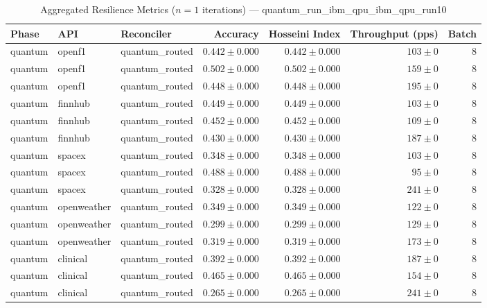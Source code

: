 
\begin{table}[htbp]
\caption{Aggregated Resilience Metrics ($n=1$ iterations) --- quantum_run_ibm_qpu_ibm_qpu_run10}
\begin{tabular}{l l l r r r r}
\hline
Phase & API & Reconciler & Accuracy & Hosseini Index & Throughput (pps) & Batch \\
\hline
quantum & openf1 & quantum\_routed & $0.442\pm0.000$ & $0.442\pm0.000$ & $103\pm0$ & 8 \\
quantum & openf1 & quantum\_routed & $0.502\pm0.000$ & $0.502\pm0.000$ & $159\pm0$ & 8 \\
quantum & openf1 & quantum\_routed & $0.448\pm0.000$ & $0.448\pm0.000$ & $195\pm0$ & 8 \\
quantum & finnhub & quantum\_routed & $0.449\pm0.000$ & $0.449\pm0.000$ & $103\pm0$ & 8 \\
quantum & finnhub & quantum\_routed & $0.452\pm0.000$ & $0.452\pm0.000$ & $109\pm0$ & 8 \\
quantum & finnhub & quantum\_routed & $0.430\pm0.000$ & $0.430\pm0.000$ & $187\pm0$ & 8 \\
quantum & spacex & quantum\_routed & $0.348\pm0.000$ & $0.348\pm0.000$ & $103\pm0$ & 8 \\
quantum & spacex & quantum\_routed & $0.488\pm0.000$ & $0.488\pm0.000$ & $95\pm0$ & 8 \\
quantum & spacex & quantum\_routed & $0.328\pm0.000$ & $0.328\pm0.000$ & $241\pm0$ & 8 \\
quantum & openweather & quantum\_routed & $0.349\pm0.000$ & $0.349\pm0.000$ & $122\pm0$ & 8 \\
quantum & openweather & quantum\_routed & $0.299\pm0.000$ & $0.299\pm0.000$ & $129\pm0$ & 8 \\
quantum & openweather & quantum\_routed & $0.319\pm0.000$ & $0.319\pm0.000$ & $173\pm0$ & 8 \\
quantum & clinical & quantum\_routed & $0.392\pm0.000$ & $0.392\pm0.000$ & $187\pm0$ & 8 \\
quantum & clinical & quantum\_routed & $0.465\pm0.000$ & $0.465\pm0.000$ & $154\pm0$ & 8 \\
quantum & clinical & quantum\_routed & $0.265\pm0.000$ & $0.265\pm0.000$ & $241\pm0$ & 8 \\

\end{tabular}
\end{table}
